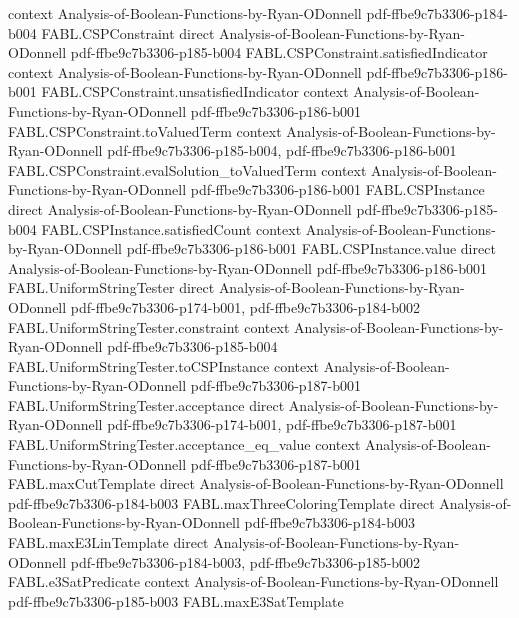 \begin{theorem}
  {context}
  {Analysis-of-Boolean-Functions-by-Ryan-ODonnell}
  {pdf-ffbe9c7b3306-p184-b004}
\proofstep
  {FABL.CSPConstraint}
  {direct}
  {Analysis-of-Boolean-Functions-by-Ryan-ODonnell}
  {pdf-ffbe9c7b3306-p185-b004}
\proofstep
  {FABL.CSPConstraint.satisfiedIndicator}
  {context}
  {Analysis-of-Boolean-Functions-by-Ryan-ODonnell}
  {pdf-ffbe9c7b3306-p186-b001}
\proofstep
  {FABL.CSPConstraint.unsatisfiedIndicator}
  {context}
  {Analysis-of-Boolean-Functions-by-Ryan-ODonnell}
  {pdf-ffbe9c7b3306-p186-b001}
\proofstep
  {FABL.CSPConstraint.toValuedTerm}
  {context}
  {Analysis-of-Boolean-Functions-by-Ryan-ODonnell}
  {pdf-ffbe9c7b3306-p185-b004,
    pdf-ffbe9c7b3306-p186-b001}
\proofstep
  {FABL.CSPConstraint.evalSolution_toValuedTerm}
  {context}
  {Analysis-of-Boolean-Functions-by-Ryan-ODonnell}
  {pdf-ffbe9c7b3306-p186-b001}
\proofstep
  {FABL.CSPInstance}
  {direct}
  {Analysis-of-Boolean-Functions-by-Ryan-ODonnell}
  {pdf-ffbe9c7b3306-p185-b004}
\proofstep
  {FABL.CSPInstance.satisfiedCount}
  {context}
  {Analysis-of-Boolean-Functions-by-Ryan-ODonnell}
  {pdf-ffbe9c7b3306-p186-b001}
\proofstep
  {FABL.CSPInstance.value}
  {direct}
  {Analysis-of-Boolean-Functions-by-Ryan-ODonnell}
  {pdf-ffbe9c7b3306-p186-b001}
\proofstep
  {FABL.UniformStringTester}
  {direct}
  {Analysis-of-Boolean-Functions-by-Ryan-ODonnell}
  {pdf-ffbe9c7b3306-p174-b001,
    pdf-ffbe9c7b3306-p184-b002}
\proofstep
  {FABL.UniformStringTester.constraint}
  {context}
  {Analysis-of-Boolean-Functions-by-Ryan-ODonnell}
  {pdf-ffbe9c7b3306-p185-b004}
\proofstep
  {FABL.UniformStringTester.toCSPInstance}
  {context}
  {Analysis-of-Boolean-Functions-by-Ryan-ODonnell}
  {pdf-ffbe9c7b3306-p187-b001}
\proofstep
  {FABL.UniformStringTester.acceptance}
  {direct}
  {Analysis-of-Boolean-Functions-by-Ryan-ODonnell}
  {pdf-ffbe9c7b3306-p174-b001,
    pdf-ffbe9c7b3306-p187-b001}
\proofstep
  {FABL.UniformStringTester.acceptance_eq_value}
  {context}
  {Analysis-of-Boolean-Functions-by-Ryan-ODonnell}
  {pdf-ffbe9c7b3306-p187-b001}
\proofstep
  {FABL.maxCutTemplate}
  {direct}
  {Analysis-of-Boolean-Functions-by-Ryan-ODonnell}
  {pdf-ffbe9c7b3306-p184-b003}
\proofstep
  {FABL.maxThreeColoringTemplate}
  {direct}
  {Analysis-of-Boolean-Functions-by-Ryan-ODonnell}
  {pdf-ffbe9c7b3306-p184-b003}
\proofstep
  {FABL.maxE3LinTemplate}
  {direct}
  {Analysis-of-Boolean-Functions-by-Ryan-ODonnell}
  {pdf-ffbe9c7b3306-p184-b003,
    pdf-ffbe9c7b3306-p185-b002}
\proofstep
  {FABL.e3SatPredicate}
  {context}
  {Analysis-of-Boolean-Functions-by-Ryan-ODonnell}
  {pdf-ffbe9c7b3306-p185-b003}
\proofstep
  {FABL.maxE3SatTemplate}

\end{theorem}

